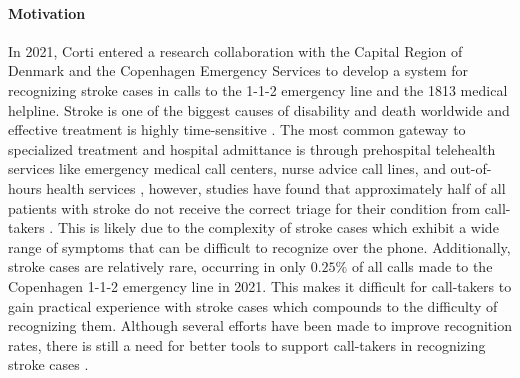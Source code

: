 \paragraph{Motivation} In 2021, Corti entered a research collaboration with the Capital Region of Denmark and the Copenhagen Emergency Services to develop a system for recognizing stroke cases in calls to the 1-1-2 emergency line and the 1813 medical helpline. 
Stroke is one of the biggest causes of disability and death worldwide \cite{cite1,cite2,cite3} and effective treatment is highly time-sensitive \cite{cite4,cite5}. The most common gateway to specialized treatment and hospital admittance is through prehospital telehealth services like emergency medical call centers, nurse advice call lines, and out-of-hours health services \cite{cite6,cite7}, however, studies have found that approximately half of all patients with stroke do not receive the correct triage for their condition from call-takers \cite{cite10,cite11,cite12}. 
This is likely due to the complexity of stroke cases which exhibit a wide range of symptoms that can be difficult to recognize over the phone. Additionally, stroke cases are relatively rare, occurring in only $0.25\%$ of all calls made to the Copenhagen 1-1-2 emergency line in 2021. This makes it difficult for call-takers to gain practical experience with stroke cases which compounds to the difficulty of recognizing them. Although several efforts have been made to improve recognition rates, there is still a need for better tools to support call-takers in recognizing stroke cases \cite{cite13,cite14,cite15}.

